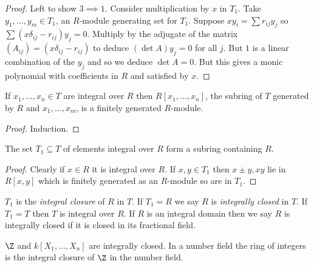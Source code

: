 \documentclass[a4paper]{article}
\begin{document}
\begin{proof}
  Left to show \(3 \implies 1\). Consider multiplication by \(x\) in \(T_1\). Take \(y_1, \dots, y_m \in T_1\), an \(R\)-module generating set for \(T_1\). Suppose \(xy_i = \sum r_{ij} y_j\) so \(\sum (x \delta_{ij} - r_{ij}) y_j = 0\). Multiply by the adjugate of the matrix \((A_{ij}) = (x \delta_{ij} - r_{ij})\) to deduce \((\det A) y_j = 0\) for all \(j\). But \(1\) is a linear combination of the \(y_j\) and so we deduce \(\det A = 0\). But this gives a monic polynomial with coefficients in \(R\) and satisfied by \(x\).
\end{proof}

\begin{lemma}
  If \(x_1, \dots, x_n \in T\) are integral over \(R\) then \(R[x_1, \dots, x_n]\), the subring of \(T\) generated by \(R\) and \(x_1, \dots, x_m\), is a finitely generated \(R\)-module.
\end{lemma}

\begin{proof}
  Induction.
\end{proof}

\begin{lemma}
  The set \(T_1 \subseteq T\) of elements integral over \(R\) form a subring containing \(R\).
\end{lemma}

\begin{proof}
  Clearly if \(x \in R\) it is integral over \(R\). If \(x, y \in T_1\) then \(x \pm y, xy\) lie in \(R[x, y]\) which is finitely generated as an \(R\)-module so are in \(T_1\).
\end{proof}

\begin{definition}
  \(T_1\) is the \emph{integral closure} of \(R\) in \(T\). If \(T_1 = R\) we say \(R\) is \emph{integrally closed} in \(T\). If \(T_1 = T\) then \(T\) is integral over \(R\). If \(R\) is an integral domain then we say \(R\) is integrally closed if it is closed in its fractional field.
\end{definition}

\begin{eg}
  \(\Z\) and \(k[X_1, \dots, X_n]\) are integrally closed. In a number field the ring of integers is the integral closure of \(\Z\) in the number field.
\end{eg}
\end{document}
